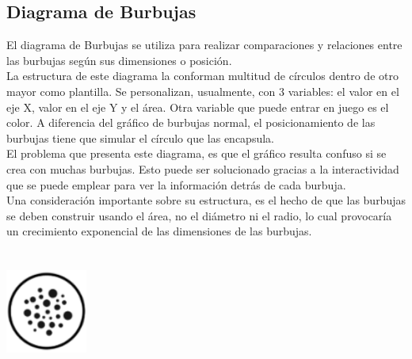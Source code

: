\documentclass{article}\usepackage[]{graphicx}\usepackage[]{color}
\begin{document}
\subsection{Diagrama de Burbujas}
El diagrama de Burbujas se utiliza para realizar comparaciones y relaciones entre las burbujas seg\'un sus dimensiones o posici\'on.~\\
La estructura de este diagrama la conforman multitud de c\'irculos dentro de otro mayor como plantilla. Se personalizan, usualmente, con 3 variables: el valor en el eje X, valor en el eje Y y el \'area. Otra variable que puede entrar en juego es el color. A diferencia del gr\'afico de burbujas normal, el posicionamiento de las burbujas tiene que simular el c\'irculo que las encapsula.~\\
El problema que presenta este diagrama, es que el gr\'afico resulta confuso si se crea con muchas burbujas. Esto puede ser solucionado gracias a la interactividad que se puede emplear para ver la informaci\'on detr\'as de cada burbuja.~\\
Una consideraci\'on importante sobre su estructura, es el hecho de que las burbujas se deben construir usando el \'area, no el di\'ametro ni el radio, lo cual provocar\'ia un crecimiento exponencial de las dimensiones de las burbujas.
~\\~\\~\\
\vbox{
    \centering
    \includegraphics[width=0.2\textwidth]{imag/bubbles}
}
\clearpage
\end{document}

